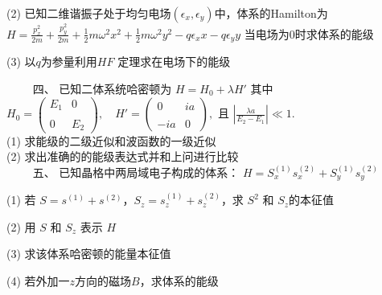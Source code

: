 (2) 已知二维谐振子处于均匀电场$(\epsilon_x, \epsilon_y)$中，体系的Hamilton为 
$H = \frac{p_x^2}{2m} + \frac{p_y^2}{2m} + \frac{1}{2}m\omega^2 x^2 + \frac{1}{2}m\omega^2 y^2 - q\epsilon_x x - q\epsilon_y y$
当电场为0时求体系的能级

(3) 以$q$为参量利用$HF$ 定理求在电场下的能级

　　 四、
已知二体系统哈密顿为 
$H = H_0 + \lambda H'$
其中
$H_0 = \begin{pmatrix}E_1 & 0 \\\\0 & E_2\end{pmatrix}, \quad H' = \begin{pmatrix}0 & ia \\\\-ia & 0\end{pmatrix},$
且 $\left|\frac{\lambda a}{E_2 - E_1}\right| \ll 1$.\\
(1) 求能级的二级近似和波函数的一级近似\\
(2) 求出准确的的能级表达式并和上问进行比较\\

　　 五、
已知晶格中两局域电子构成的体系：
$H = S_x^{(1)} s_x^{(2)} + S_y^{(1)} s_y^{(2)}$

(1) 若 $S = s^{(1)} + s^{(2)}$，$S_z = s_z^{(1)} + s_z^{(2)}$，求 $S^2$ 和 $S_z$的本征值

(2) 用 $S$ 和 $S_z$ 表示 $H$

(3) 求该体系哈密顿的能量本征值

(4) 若外加一$z$方向的磁场$B$，求体系的能级
